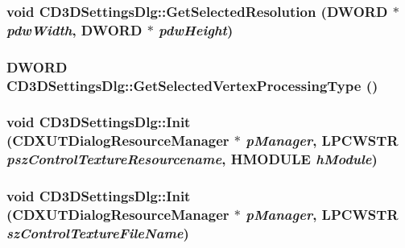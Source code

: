 \label{class_c_d3_d_settings_dlg_ab2c395b2c12a94c6491d4639617fe1ac}
\hypertarget{class_c_d3_d_settings_dlg_a64deb789f38a469aaae9b24a98c1ba89}{
\subsubsection[{GetSelectedResolution}]{\setlength{\rightskip}{0pt plus 5cm}void CD3DSettingsDlg::GetSelectedResolution (DWORD $\ast$ {\em pdwWidth}, \/  DWORD $\ast$ {\em pdwHeight})}}
\label{class_c_d3_d_settings_dlg_a64deb789f38a469aaae9b24a98c1ba89}
\hypertarget{class_c_d3_d_settings_dlg_a1c3324649ea149106ca0af2c43f880fe}{
\subsubsection[{GetSelectedVertexProcessingType}]{\setlength{\rightskip}{0pt plus 5cm}DWORD CD3DSettingsDlg::GetSelectedVertexProcessingType ()}}
\label{class_c_d3_d_settings_dlg_a1c3324649ea149106ca0af2c43f880fe}
\hypertarget{class_c_d3_d_settings_dlg_acbf3721135cc7408a8aeb0cc0340d3a8}{
\subsubsection[{Init}]{\setlength{\rightskip}{0pt plus 5cm}void CD3DSettingsDlg::Init ({\bf CDXUTDialogResourceManager} $\ast$ {\em pManager}, \/  LPCWSTR {\em pszControlTextureResourcename}, \/  HMODULE {\em hModule})}}
\label{class_c_d3_d_settings_dlg_acbf3721135cc7408a8aeb0cc0340d3a8}
\hypertarget{class_c_d3_d_settings_dlg_a3a9d268771e11c24188ad4be4185ede3}{
\subsubsection[{Init}]{\setlength{\rightskip}{0pt plus 5cm}void CD3DSettingsDlg::Init ({\bf CDXUTDialogResourceManager} $\ast$ {\em pManager}, \/  LPCWSTR {\em szControlTextureFileName})}}
